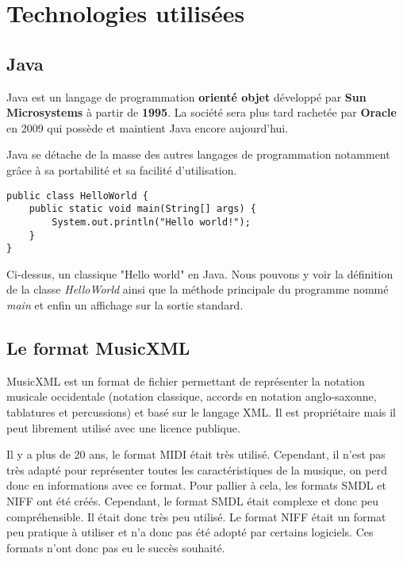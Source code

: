 \section{Technologies utilisées}

\subsection{Java}

\par Java est un langage de programmation \textbf{orienté objet} développé par \textbf{Sun Microsystems} à partir de \textbf{1995}. La société sera plus tard rachetée par \textbf{Oracle} en 2009 qui possède et maintient Java encore aujourd'hui.
\par Java se détache de la masse des autres langages de programmation notamment grâce à sa portabilité et sa facilité d'utilisation.

\begin{lstlisting}[caption=Hello world en java]
public class HelloWorld {
    public static void main(String[] args) {
        System.out.println("Hello world!");
    }
}
\end{lstlisting}

Ci-dessus, un classique "Hello world" en Java. Nous pouvons y voir la définition de la classe \emph{HelloWorld} ainsi que la méthode principale du programme nommé \emph{main} et enfin un affichage sur la sortie standard.



\subsection{Le format MusicXML}
MusicXML est un format de fichier permettant de représenter la notation musicale occidentale (notation classique, accords en notation anglo-saxonne, tablatures et percussions) et basé sur le langage XML. Il est propriétaire mais il peut librement utilisé avec une licence publique.

Il y a plus de 20 ans, le format MIDI était très utilisé. Cependant, il n’est pas très adapté pour représenter toutes les caractéristiques de la musique, on perd donc en informations avec ce format. Pour pallier à cela, les formats SMDL et NIFF ont été créés. Cependant, le format SMDL était complexe et donc peu compréhensible. Il était donc très peu utilisé. Le format NIFF était un format peu pratique à utiliser et n’a donc pas été adopté par certains logiciels. Ces formats n’ont donc pas eu le succès souhaité.

